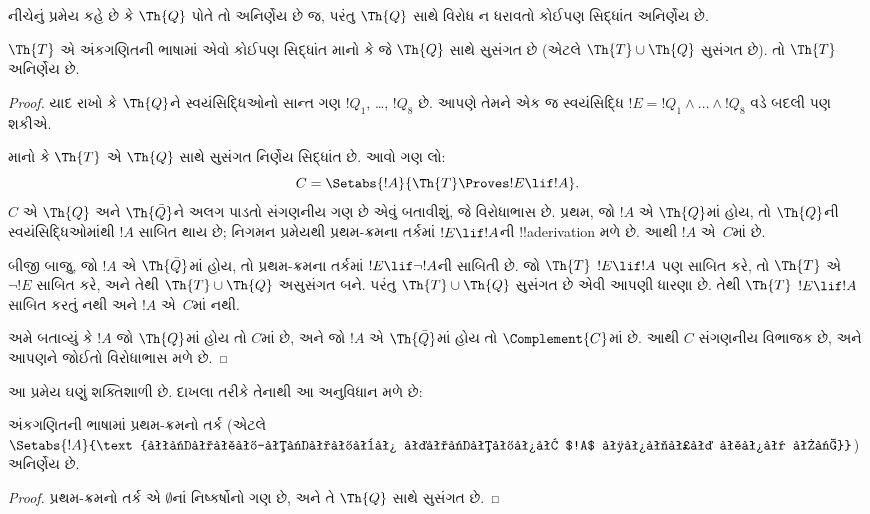 \documentclass[../../../include/open-logic-section]{subfiles}
\begin{document}


નીચેનું પ્રમેય કહે છે કે
$\Th{Q}$ પોતે તો અનિર્ણેય
છે જ, પરંતુ $\Th{Q}$ સાથે
વિરોધ ન ધરાવતો કોઈપણ
સિદ્ધાંત અનિર્ણેય છે.

\begin{thm}
$\Th{T}$ એ અંકગણિતની
ભાષામાં એવો કોઈપણ સિદ્ધાંત
માનો કે જે $\Th{Q}$ સાથે
સુસંગત છે (એટલે
$\Th{T} \cup \Th{Q}$
સુસંગત છે). તો
$\Th{T}$ અનિર્ણેય છે.
\end{thm}

\begin{proof}
યાદ રાખો કે $\Th{Q}$ને
સ્વયંસિદ્ધિઓનો સાન્ત ગણ
$!Q_1$, \dots,
$!Q_8$ છે. આપણે તેમને
એક જ સ્વયંસિદ્ધિ
$!E = !Q_1 \land
\dots \land !Q_8$ વડે
બદલી પણ શકીએ.

માનો કે $\Th{T}$ એ
$\Th{Q}$ સાથે સુસંગત
નિર્ણેય સિદ્ધાંત છે.
આવો ગણ લો:
\[
C = \Setabs{!A}{\Th{T} \Proves !E \lif !A}.
\]
$C$ એ $\Th{Q}$ અને
$\Th{\bar Q}$ને અલગ પાડતો
સંગણનીય ગણ છે એવું બતાવીશું,
જે વિરોધાભાસ છે. પ્રથમ,
જો $!A$ એ $\Th{Q}$માં
હોય, તો $\Th{Q}$ની
સ્વયંસિદ્ધિઓમાંથી $!A$
સાબિત થાય છે; નિગમન
પ્રમેયથી પ્રથમ-ક્રમના
તર્કમાં $!E \lif !A$ની
!!a{derivation} મળે છે.
આથી $!A$ એ~$C$માં છે.

બીજી બાજુ, જો $!A$ એ
$\Th{\bar Q}$માં હોય,
તો પ્રથમ-ક્રમના તર્કમાં
$!E \lif \lnot !A$ની
સાબિતી છે. જો $\Th{T}$
$!E \lif !A$ પણ સાબિત
કરે, તો $\Th{T}$ એ
$\lnot !E$ સાબિત કરે,
અને તેથી $\Th{T}
\cup \Th{Q}$ અસુસંગત બને.
પરંતુ $\Th{T} \cup \Th{Q}$
સુસંગત છે એવી આપણી
ધારણા છે. તેથી $\Th{T}$
$!E \lif !A$ સાબિત કરતું
નથી અને $!A$ એ~$C$માં
નથી.

અમે બતાવ્યું કે $!A$ જો
$\Th{Q}$માં હોય તો $C$માં
છે, અને જો $!A$ એ
$\Th{\bar Q}$માં હોય તો
$\Complement{C}$માં છે.
આથી $C$ સંગણનીય વિભાજક
છે, અને આપણને જોઈતો
વિરોધાભાસ મળે છે.
\end{proof}

આ પ્રમેય ઘણું શક્તિશાળી છે.
દાખલા તરીકે તેનાથી આ
અનુવિધાન મળે છે:

\begin{cor}
  અંકગણિતની ભાષામાં
  પ્રથમ-ક્રમનો તર્ક (એટલે
  $\Setabs{!A}{\text{પ્રથમ-ક્રમના તર્કમાં $!A$ સાબિત થાય છે}}$)
  અનિર્ણેય છે.
\end{cor}

\begin{proof}
પ્રથમ-ક્રમનો તર્ક એ
$\emptyset$નાં નિષ્કર્ષોનો
ગણ છે, અને તે
$\Th{Q}$ સાથે સુસંગત છે.
\end{proof}
\end{document}
